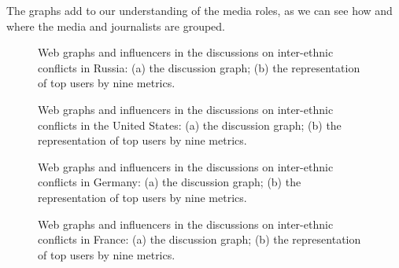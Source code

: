 The graphs add to our understanding of the media roles, as we can see how and where the media and journalists are grouped.

\begin{figure}[ht]
	\caption{Web graphs and influencers in the discussions on inter-ethnic conflicts in Russia: (a) the discussion graph; (b) the representation of top users by nine metrics.}\label{fig:webGraphsRussia}
\end{figure}

\clearpage

\begin{figure}[ht]
	\caption{Web graphs and influencers in the discussions on inter-ethnic conflicts in the United States: (a) the discussion graph; (b) the representation of top users by nine metrics.}\label{fig:webGraphsUS}
\end{figure}

\clearpage

\begin{figure}[ht]
	\caption{Web graphs and influencers in the discussions on inter-ethnic conflicts in Germany: (a) the discussion graph; (b) the representation of top users by nine metrics.}\label{fig:webGraphsGermany}
\end{figure}

\clearpage

\begin{figure}[ht]
	\caption{Web graphs and influencers in the discussions on inter-ethnic conflicts in France: (a) the discussion graph; (b) the representation of top users by nine metrics.}\label{fig:webGraphsFrance}
\end{figure}

